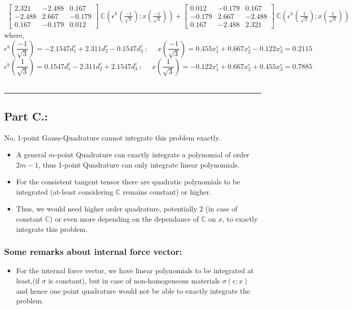 \documentclass[11pt]{article}
\begin{document}
\begin{align}
\begin{bmatrix}
2.321 & -2.488 & 0.167 \\
-2.488 & 2.667 & -0.179 \\
0.167 & -0.179 & 0.012
\end{bmatrix}\ \mathbb{C}
\left(
\epsilon^h (\frac{-1}{\sqrt{3}}) ; x(\frac{-1}{\sqrt{3}})
\right)+
\begin{bmatrix}
0.012 & -0.179 & 0.167 \\
-0.179 & 2.667 & - 2.488 \\
0.167 & -2.488 & 2.321
\end{bmatrix}\ \mathbb{C}
\left(
\epsilon^h (\frac{1}{\sqrt{3}}) ; x(\frac{1}{\sqrt{3}})
\right)
\end{align}
where,
\[
\epsilon^h \left(\frac{-1}{\sqrt{3}} \right) 
= 
-2.1547 d^e_1 + 2.311 d^e_2 - 0.1547 d^e_3\ ; \ \ \ \ \ \ 
x\left(\frac{-1}{\sqrt{3}} \right) 
= 0.455 x^e_1 + 0.667 x^e_2 -0.122 x^e_3 = 0.2115
\]
\[
\epsilon^h \left(\frac{1}{\sqrt{3}} \right) 
= 
0.1547 d^e_1 - 2.311 d^e_2 + 2.1547 d^e_3\ ; \ \ \ \ \ \ x\left(\frac{1}{\sqrt{3}} \right) 
= -0.122 x^e_1 + 0.667 x^e_2 + 0.455 x^e_3 = 0.7885
\]  \\ \hrule
\subsection*{Part C.:}
No, 1-point Gauss-Quadrature cannot integrate this problem exactly. 
\begin{itemize}
\item A general $m$-point Quadrature can exactly integrate a polynomial of order $2m-1$, thus 1-point Quadrature can only integrate linear polynomials. 
\item For the consistent tangent tensor there are quadratic polynomials to be integrated (at-least considering {$\mathbb{C}$} remains constant) or higher. 
\item Thus, we would need higher order quadrature, potentially 2 (in case of constant $\mathbb{C}$) or even more depending on the dependance of $\mathbb{C}$ on $x$, to exactly integrate this problem.
\end{itemize}
\subsubsection*{Some remarks about internal force vector:}
\begin{itemize}
\item For the internal force vector, we have linear polynomials to be integrated at least,(if $\sigma$ is constant), but in case of non-homogeneous materials $\sigma(\epsilon;x)$ and hence one point quadrature would not be able to exactly integrate the problem. 
\end{itemize}
\end{document}
